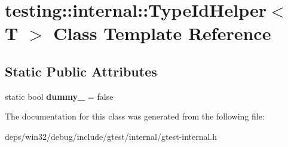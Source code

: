 \hypertarget{classtesting_1_1internal_1_1_type_id_helper}{}\section{testing\+:\+:internal\+:\+:Type\+Id\+Helper$<$ T $>$ Class Template Reference}
\label{classtesting_1_1internal_1_1_type_id_helper}
\subsection*{Static Public Attributes}
\begin{DoxyCompactItemize}
\item 
\hypertarget{classtesting_1_1internal_1_1_type_id_helper_a372268b1520d965d0bdf01ebad3d270e}{}static bool {\bfseries dummy\+\_\+} = false\label{classtesting_1_1internal_1_1_type_id_helper_a372268b1520d965d0bdf01ebad3d270e}

\end{DoxyCompactItemize}


The documentation for this class was generated from the following file\+:\begin{DoxyCompactItemize}
\item 
deps/win32/debug/include/gtest/internal/gtest-\/internal.\+h\end{DoxyCompactItemize}
